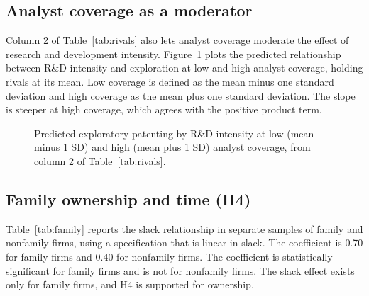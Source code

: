 \documentclass[11pt]{article}
\begin{document}
\subsection{Analyst coverage as a moderator}

Column 2 of Table~\ref{tab:rivals} also lets analyst coverage moderate the effect of research and development intensity. Figure~\ref{fig:coverage} plots the predicted relationship between R\&D intensity and exploration at low and high analyst coverage, holding rivals at its mean. Low coverage is defined as the mean minus one standard deviation and high coverage as the mean plus one standard deviation. The slope is steeper at high coverage, which agrees with the positive product term.

\begin{figure}[H]
\centering
{}
\caption{Predicted exploratory patenting by R\&D intensity at low (mean minus 1 SD) and high (mean plus 1 SD) analyst coverage, from column 2 of Table~\ref{tab:rivals}.}\label{fig:coverage}
\end{figure}

\subsection{Family ownership and time (H4)}

Table~\ref{tab:family} reports the slack relationship in separate samples of family and nonfamily firms, using a specification that is linear in slack. The coefficient is 0.70 for family firms and 0.40 for nonfamily firms. The coefficient is statistically significant for family firms and is not for nonfamily firms. The slack effect exists only for family firms, and H4 is supported for ownership.
\end{document}

